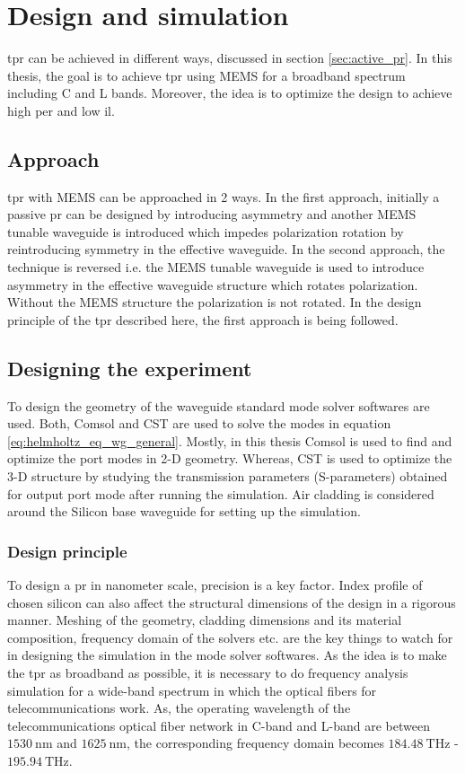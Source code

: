 \documentclass[../report.tex]{subfiles}
\begin{document}
	

\chapter{Design and simulation}
\gls{tpr} can be achieved in different ways, discussed in section \ref*{sec:active_pr}. In this thesis, the goal is to achieve \gls{tpr} using MEMS for a broadband spectrum including C and L bands. Moreover, the idea is to optimize the design to achieve high \gls{per} and low \gls{il}.  
	
	\section{Approach}
	\gls{tpr} with MEMS can be approached in 2 ways. In the first approach, initially a passive \gls{pr} can be designed by introducing asymmetry and another MEMS tunable waveguide is introduced which impedes polarization rotation by reintroducing symmetry in the effective waveguide. In the second approach, the technique is reversed i.e. the MEMS tunable waveguide is used to introduce asymmetry in the effective waveguide structure which rotates polarization. Without the MEMS structure the polarization is not rotated. In the design principle of the \gls{tpr} described here, the first approach is being followed.  
	
	\section{Designing the experiment}
	To design the geometry of the waveguide standard mode solver softwares are used. Both, Comsol\cite{comsol_2015} and CST \cite{cst_2015} are used to solve the modes in equation \ref{eq:helmholtz_eq_wg_general}. Mostly, in this thesis Comsol is used to find and optimize the port modes in 2-D geometry. Whereas, CST is used to optimize the 3-D structure by studying the transmission parameters (S-parameters) obtained for output port mode after running the simulation. Air cladding is considered around the Silicon base waveguide for setting up the simulation.
		
		\subsection{Design principle}
To design a \gls{pr} in nanometer scale, precision is a key factor. Index profile of chosen silicon can also affect the structural dimensions of the design in a rigorous manner. Meshing of the geometry, cladding dimensions and its material composition, frequency domain of the solvers etc. are the key things to watch for in designing the simulation in the mode solver softwares. As the idea is to make the \gls{tpr} as broadband as possible, it is necessary to do frequency analysis simulation for a wide-band spectrum in which the optical fibers for telecommunications work. As, the operating wavelength of the telecommunications optical fiber network in C-band and L-band are between $\SI{1530}{\nano\metre}$ and $\SI{1625}{\nano\metre}$, the corresponding frequency domain becomes $\SI{184.48}{\THz}$ - $\SI{195.94}{\THz}$.
	
\end{document}
